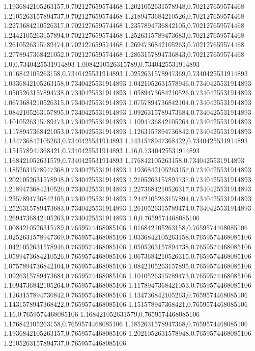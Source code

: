 1.1936842105263157,0.702127659574468
1.2021052631578948,0.702127659574468
1.2105263157894737,0.702127659574468
1.2189473684210526,0.702127659574468
1.2273684210526317,0.702127659574468
1.2357894736842105,0.702127659574468
1.2442105263157894,0.702127659574468
1.2526315789473683,0.702127659574468
1.2610526315789474,0.702127659574468
1.2694736842105263,0.702127659574468
1.2778947368421052,0.702127659574468
1.2863157894736843,0.702127659574468
1.0,0.7340425531914893
1.0084210526315789,0.7340425531914893
1.016842105263158,0.7340425531914893
1.0252631578947369,0.7340425531914893
1.0336842105263158,0.7340425531914893
1.0421052631578946,0.7340425531914893
1.0505263157894738,0.7340425531914893
1.0589473684210526,0.7340425531914893
1.0673684210526315,0.7340425531914893
1.0757894736842104,0.7340425531914893
1.0842105263157895,0.7340425531914893
1.0926315789473684,0.7340425531914893
1.1010526315789473,0.7340425531914893
1.1094736842105264,0.7340425531914893
1.1178947368421053,0.7340425531914893
1.1263157894736842,0.7340425531914893
1.134736842105263,0.7340425531914893
1.1431578947368422,0.7340425531914893
1.151578947368421,0.7340425531914893
1.16,0.7340425531914893
1.168421052631579,0.7340425531914893
1.176842105263158,0.7340425531914893
1.1852631578947368,0.7340425531914893
1.1936842105263157,0.7340425531914893
1.2021052631578948,0.7340425531914893
1.2105263157894737,0.7340425531914893
1.2189473684210526,0.7340425531914893
1.2273684210526317,0.7340425531914893
1.2357894736842105,0.7340425531914893
1.2442105263157894,0.7340425531914893
1.2526315789473683,0.7340425531914893
1.2610526315789474,0.7340425531914893
1.2694736842105263,0.7340425531914893
1.0,0.7659574468085106
1.0084210526315789,0.7659574468085106
1.016842105263158,0.7659574468085106
1.0252631578947369,0.7659574468085106
1.0336842105263158,0.7659574468085106
1.0421052631578946,0.7659574468085106
1.0505263157894738,0.7659574468085106
1.0589473684210526,0.7659574468085106
1.0673684210526315,0.7659574468085106
1.0757894736842104,0.7659574468085106
1.0842105263157895,0.7659574468085106
1.0926315789473684,0.7659574468085106
1.1010526315789473,0.7659574468085106
1.1094736842105264,0.7659574468085106
1.1178947368421053,0.7659574468085106
1.1263157894736842,0.7659574468085106
1.134736842105263,0.7659574468085106
1.1431578947368422,0.7659574468085106
1.151578947368421,0.7659574468085106
1.16,0.7659574468085106
1.168421052631579,0.7659574468085106
1.176842105263158,0.7659574468085106
1.1852631578947368,0.7659574468085106
1.1936842105263157,0.7659574468085106
1.2021052631578948,0.7659574468085106
1.2105263157894737,0.7659574468085106
